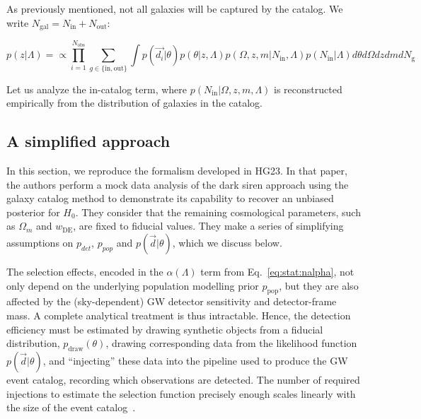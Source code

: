 \documentclass[%
preprint,
nofootinbib,
 amsmath,amssymb,
 aps,
]{revtex4-2}
\newcommand{\given}[2]{p( #1 | #2 )}
\newcommand{\ppop}[0]{p_{\text{pop}}}
\newcommand{\nobs}[0]{N_{\text{obs}}}
\begin{document}
As previously mentioned, not all galaxies will be captured by the catalog. We write $N_\text{gal} =
	N_\text{in} + N_\text{out}$:

\begin{equation}
	\given{z}{\Lambda} = \propto \prod_{i=1}^{\nobs} \sum_{g \in \{\text{in}, \text{out}\}} \int \given{\vec{d_i}}{\theta} \given{\theta}{z, \Lambda} \given{\Omega, z, m}{N_\text{in}, \Lambda} \given{N_\text{in}}{\Lambda} d\theta d\Omega  dz dm dN_\text{g}
\end{equation}

Let us analyze the in-catalog term, where $\given{N_\text{in}}{\Omega, z, m, \Lambda}$ is
reconstructed empirically from the distribution of galaxies in the catalog.




\subsection{A simplified approach}
\label{sec:stat:simplified}

In this section, we reproduce the formalism developed in HG23. In that paper, the authors perform a
mock data analysis of the dark siren approach using the galaxy catalog method to demonstrate its
capability to recover an unbiased posterior for $H_0$. They consider that the remaining
cosmological parameters, such as $\Omega_m$ and $w_\text{DE}$, are fixed to fiducial values. They
make a series of simplifying assumptions on $p_{det}$, $p_{pop}$ and $\given{\vec{d}}{\theta}$,
which we discuss below.

The selection effects, encoded in the $\alpha (\Lambda )$ term from Eq.~\eqref{eq:stat:nalpha}, not
only depend on the underlying population modelling prior $\ppop$, but they are also affected by the
(sky-dependent) GW detector sensitivity and detector-frame mass. A complete analytical treatment is
thus intractable. Hence, the detection efficiency must be estimated by drawing synthetic objects
from a fiducial distribution, $p_\text{draw}(\theta)$, drawing corresponding data from the
likelihood function $\given{\vec{d}}{\theta}$, and “injecting” these data into the pipeline used to
produce the GW event catalog, recording which observations are detected. The number of required
injections to estimate the selection function precisely enough scales linearly with the size of the
event catalog~\cite{essick2022precision}.
\end{document}
